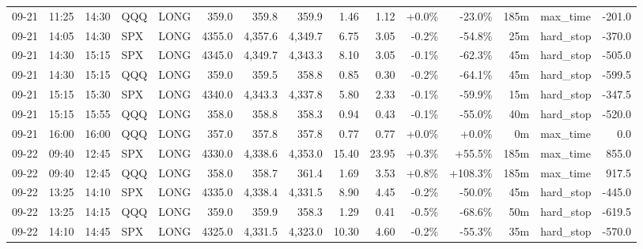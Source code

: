 \documentclass[11pt,a4paper,twoside]{article}
\begin{document}
\begin{landscape}
\begin{center}
\begin{longtable}{>{\color{txtmain}}l l l l l r r r r r r r r >{\color{txtmain}}l r}
09-21 & 11:25 & 14:30 & QQQ & LONG & 359.0 & 359.8 & 359.9 & 1.46 & 1.12 & \textcolor{wingreen}{+0.0\%} & \textcolor{lossred}{-23.0\%} & 185m & max\_time & \textcolor{lossred}{-201.0} \\
09-21 & 14:05 & 14:30 & SPX & LONG & 4355.0 & 4,357.6 & 4,349.7 & 6.75 & 3.05 & \textcolor{lossred}{-0.2\%} & \textcolor{lossred}{-54.8\%} & 25m & hard\_stop & \textcolor{lossred}{-370.0} \\
09-21 & 14:30 & 15:15 & SPX & LONG & 4345.0 & 4,349.7 & 4,343.3 & 8.10 & 3.05 & \textcolor{lossred}{-0.1\%} & \textcolor{lossred}{-62.3\%} & 45m & hard\_stop & \textcolor{lossred}{-505.0} \\
09-21 & 14:30 & 15:15 & QQQ & LONG & 359.0 & 359.5 & 358.8 & 0.85 & 0.30 & \textcolor{lossred}{-0.2\%} & \textcolor{lossred}{-64.1\%} & 45m & hard\_stop & \textcolor{lossred}{-599.5} \\
09-21 & 15:15 & 15:30 & SPX & LONG & 4340.0 & 4,343.3 & 4,337.8 & 5.80 & 2.33 & \textcolor{lossred}{-0.1\%} & \textcolor{lossred}{-59.9\%} & 15m & hard\_stop & \textcolor{lossred}{-347.5} \\
09-21 & 15:15 & 15:55 & QQQ & LONG & 358.0 & 358.8 & 358.3 & 0.94 & 0.43 & \textcolor{lossred}{-0.1\%} & \textcolor{lossred}{-55.0\%} & 40m & hard\_stop & \textcolor{lossred}{-520.0} \\
09-21 & 16:00 & 16:00 & QQQ & LONG & 357.0 & 357.8 & 357.8 & 0.77 & 0.77 & \textcolor{wingreen}{+0.0\%} & \textcolor{wingreen}{+0.0\%} & 0m & max\_time & \textcolor{wingreen}{0.0} \\
09-22 & 09:40 & 12:45 & SPX & LONG & 4330.0 & 4,338.6 & 4,353.0 & 15.40 & 23.95 & \textcolor{wingreen}{+0.3\%} & \textcolor{wingreen}{+55.5\%} & 185m & max\_time & \textcolor{wingreen}{855.0} \\
09-22 & 09:40 & 12:45 & QQQ & LONG & 358.0 & 358.7 & 361.4 & 1.69 & 3.53 & \textcolor{wingreen}{+0.8\%} & \textcolor{wingreen}{+108.3\%} & 185m & max\_time & \textcolor{wingreen}{917.5} \\
09-22 & 13:25 & 14:10 & SPX & LONG & 4335.0 & 4,338.4 & 4,331.5 & 8.90 & 4.45 & \textcolor{lossred}{-0.2\%} & \textcolor{lossred}{-50.0\%} & 45m & hard\_stop & \textcolor{lossred}{-445.0} \\
09-22 & 13:25 & 14:15 & QQQ & LONG & 359.0 & 359.9 & 358.3 & 1.29 & 0.41 & \textcolor{lossred}{-0.5\%} & \textcolor{lossred}{-68.6\%} & 50m & hard\_stop & \textcolor{lossred}{-619.5} \\
09-22 & 14:10 & 14:45 & SPX & LONG & 4325.0 & 4,331.5 & 4,323.0 & 10.30 & 4.60 & \textcolor{lossred}{-0.2\%} & \textcolor{lossred}{-55.3\%} & 35m & hard\_stop & \textcolor{lossred}{-570.0} \\

\end{longtable}
\end{center}
\end{landscape}
\end{document}
